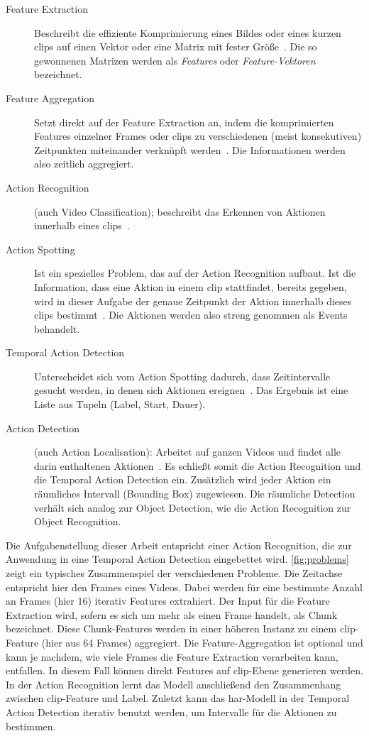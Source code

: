 \begin{description}
    \item[Feature Extraction]
    Beschreibt die effiziente Komprimierung eines Bildes oder eines kurzen \glspl{clip} auf einen Vektor oder eine Matrix mit fester Größe~\cite{Tran14}.
    Die so gewonnenen Matrizen werden als \emph{Features} oder \emph{Feature-Vektoren} bezeichnet.
    \item[Feature Aggregation]
    Setzt direkt auf der Feature Extraction an, indem die komprimierten Features einzelner Frames oder \glspl{clip} zu verschiedenen (meist konsekutiven) Zeitpunkten miteinander verknüpft werden~\cite{Ng15}.
    Die Informationen werden also zeitlich aggregiert.
    \item[Action Recognition]
    (auch Video Classification); beschreibt das Erkennen von Aktionen innerhalb eines \glspl{clip}~\cite{Rodriguez08}.
    \item[Action Spotting]
    Ist ein spezielles Problem, das auf der Action Recognition aufbaut.
    Ist die Information, dass eine Aktion in einem \gls{clip} stattfindet, bereits gegeben, wird in dieser Aufgabe der genaue Zeitpunkt der Aktion innerhalb dieses \glspl{clip} bestimmt~\cite{Giancola18}.
    Die Aktionen werden also streng genommen als Events behandelt.
    \item[Temporal Action Detection]
    Unterscheidet sich vom Action Spotting dadurch, dass Zeitintervalle gesucht werden, in denen sich Aktionen ereignen~\cite{Xia20}.
    Das Ergebnis ist eine Liste aus Tupeln (Label, Start, Dauer).
    \item[Action Detection]
    (auch Action Localisation): Arbeitet auf ganzen Videos und findet alle darin enthaltenen Aktionen~\cite{Xia20}.
    Es schließt somit die Action Recognition und die Temporal Action Detection ein.
    Zusätzlich wird jeder Aktion ein räumliches Intervall (Bounding Box) zugewiesen.
    Die räumliche Detection verhält sich analog zur Object Detection, wie die Action Recognition zur Object Recognition.
\end{description}


Die Aufgabenstellung dieser Arbeit entspricht einer Action Recognition, die zur Anwendung in eine Temporal Action Detection eingebettet wird.
\autoref{fig:problems} zeigt ein typisches Zusammenspiel der verschiedenen Probleme.
Die Zeitachse entspricht hier den Frames eines Videos.
Dabei werden für eine bestimmte Anzahl an Frames (hier 16) iterativ Features extrahiert.
Der Input für die Feature Extraction wird, sofern es sich um mehr als einen Frame handelt, als Chunk bezeichnet.
Diese Chunk-Features werden in einer höheren Instanz zu einem \gls{clip}-Feature (hier aus 64 Frames) aggregiert.
Die Feature-Aggregation ist optional und kann je nachdem, wie viele Frames die Feature Extraction verarbeiten kann, entfallen.
In diesem Fall können direkt Features auf \gls{clip}-Ebene generieren werden.
In der Action Recognition lernt das Modell anschließend den Zusammenhang zwischen \gls{clip}-Feature und Label.
Zuletzt kann das \gls{har}-Modell in der Temporal Action Detection iterativ benutzt werden, um Intervalle für die Aktionen zu bestimmen.

